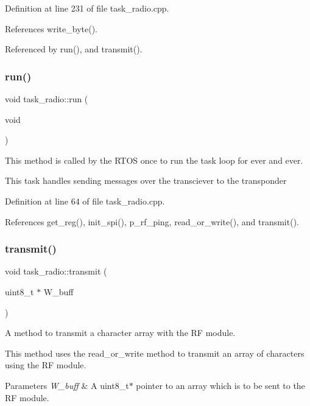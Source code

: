 Definition at line 231 of file task\+\_\+radio.\+cpp.



References write\+\_\+byte().



Referenced by run(), and transmit().

\mbox{\label{classtask__radio_a4aeed57265c3fd031bd1219a9854811d}} 
\subsubsection{\texorpdfstring{run()}{run()}}
{\footnotesize\ttfamily void task\+\_\+radio\+::run (\begin{DoxyParamCaption}\item[{void}]{ }\end{DoxyParamCaption})}

This method is called by the R\+T\+OS once to run the task loop for ever and ever.

This task handles sending messages over the transciever to the transponder 

Definition at line 64 of file task\+\_\+radio.\+cpp.



References get\+\_\+reg(), init\+\_\+spi(), p\+\_\+rf\+\_\+ping, read\+\_\+or\+\_\+write(), and transmit().

\mbox{\label{classtask__radio_ae86d2810bfbf4174f73b6c975f2deef4}} 
\subsubsection{\texorpdfstring{transmit()}{transmit()}}
{\footnotesize\ttfamily void task\+\_\+radio\+::transmit (\begin{DoxyParamCaption}\item[{uint8\+\_\+t $\ast$}]{W\+\_\+buff }\end{DoxyParamCaption})\hspace{0.3cm}{\ttfamily [protected]}}



A method to transmit a character array with the RF module. 

This method uses the read\+\_\+or\+\_\+write method to transmit an array of characters using the RF module. 
\begin{DoxyParams}{Parameters}
{\em W\+\_\+buff} & A uint8\+\_\+t$\ast$ pointer to an array which is to be sent to the RF module. \\
\hline
\end{DoxyParams}


